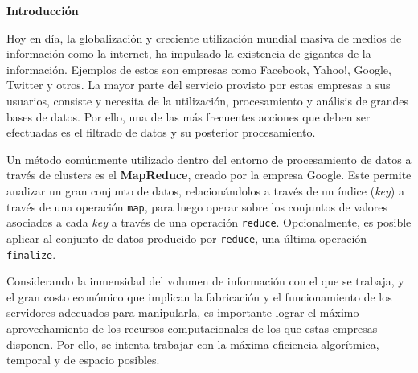 \begin{center}
  \textbf{Introducción}
\end{center}

    Hoy en día, la globalización y creciente utilización mundial masiva de medios de
    información como la internet, ha impulsado la existencia de  gigantes de la
    información. Ejemplos de estos son empresas como Facebook, Yahoo!, Google,
    Twitter y otros. La mayor parte del servicio provisto por estas empresas a sus
    usuarios, consiste y necesita de la utilización, procesamiento y análisis de
    grandes bases de datos. Por ello, una de las más frecuentes acciones que deben
    ser efectuadas es el filtrado de datos y su posterior procesamiento.

    Un método comúnmente utilizado dentro del entorno de procesamiento de datos a
    través de clusters es el \textbf{MapReduce}, creado por la empresa Google. Este
    permite analizar un gran conjunto de datos, relacionándolos a través de un
    índice (\emph{key}) a través de una operación \texttt{map}, para luego operar
    sobre los conjuntos de valores asociados a cada \emph{key} a través de una
    operación \texttt{reduce}. Opcionalmente, es posible aplicar al conjunto de
    datos producido por \texttt{reduce}, una última operación \texttt{finalize}.

    Considerando la inmensidad del volumen de información con el que se trabaja, y
    el gran costo económico que implican la fabricación y el funcionamiento de los
    servidores adecuados para manipularla, es importante lograr el máximo
    aprovechamiento de los recursos computacionales de los que estas empresas
    disponen. Por ello, se intenta trabajar con la máxima eficiencia algorítmica,
    temporal y de espacio posibles.
